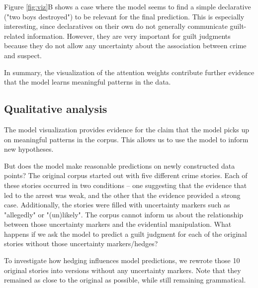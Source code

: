 \documentclass[11pt,a4paper]{article}
\begin{document}
Figure \ref{fig:viz}B shows a case where the model seems to find a simple declarative ("two boys destroyed") to be relevant for the final prediction. This is especially interesting, since declaratives on their own do not generally communicate guilt-related information. However, they are very important for guilt judgments because they do not allow any uncertainty about the association between crime and suspect.

In summary, the visualization of the attention weights contribute further evidence that the model learns meaningful patterns in the data.

\subsection{Qualitative analysis}

The model visualization provides evidence for the claim that the model picks up on meaningful patterns in the corpus. This allows us to use the model to inform new hypotheses.

But does the model make reasonable predictions on newly constructed data points?
The original corpus started out with five different crime stories. Each of these stories occurred in two conditions -- one suggesting that the evidence that led to the arrest was weak, and the other that the evidence provided a strong case. Additionally, the stories were filled with uncertainty markers such as "allegedly" or "(un)likely". The corpus cannot inform us about the relationship between those uncertainty markers and the evidential manipulation. What happens if we ask the model to predict a guilt judgment for each of the original stories without those uncertainty markers/hedges?

To investigate how hedging influences model predictions, we rewrote those 10 original stories into versions without any uncertainty markers. Note that they remained as close to the original as possible, while still remaining grammatical.
\end{document}
